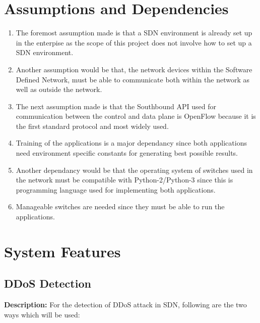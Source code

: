 \documentclass[12pt,a4paper,final]{report}
\begin{document}
\section{Assumptions and Dependencies}
\begin{enumerate}
\item 
The foremost assumption made is that a SDN environment is already set up in the enterpise as the scope of this project does not involve how to set up a SDN environment.

\item
Another assumption would be that, the network devices within the Software Defined Network, must be able to communicate both within the network as well as outside the network. 

\item
The next assumption made is that the Southbound API used for communication between the control and data plane is OpenFlow because it is the first standard protocol and most widely used.

\item
Training of the applications is a major dependancy since both applications need environment specific constants for generating best possible results.

\item
Another dependancy would be that the operating system of switches used in the network must be compatible with Python-2/Python-3 since this is programming language used for implementing both applications.

\item
Manageable switches are needed since they must be able to run the applications.
\end{enumerate}

\section{System Features}
\subsection{DDoS Detection}
\textbf{Description: } 
\newline
For the detection of DDoS attack in SDN, following are the two ways which will be used: 
\end{document}
